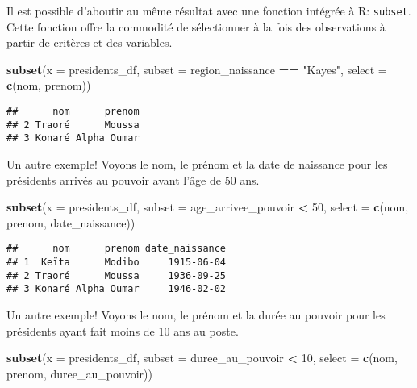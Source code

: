 \documentclass[]{book}
\newenvironment{Shaded}{\begin{snugshade}}{\end{snugshade}}
\newcommand{\KeywordTok}[1]{\textcolor[rgb]{0.13,0.29,0.53}{\textbf{#1}}}
\newcommand{\DataTypeTok}[1]{\textcolor[rgb]{0.13,0.29,0.53}{#1}}
\newcommand{\DecValTok}[1]{\textcolor[rgb]{0.00,0.00,0.81}{#1}}
\newcommand{\StringTok}[1]{\textcolor[rgb]{0.31,0.60,0.02}{#1}}
\newcommand{\OperatorTok}[1]{\textcolor[rgb]{0.81,0.36,0.00}{\textbf{#1}}}
\newcommand{\NormalTok}[1]{#1}
\begin{document}
Il est possible d'aboutir au même résultat avec une fonction intégrée à
R: \texttt{subset}. Cette fonction offre la commodité de sélectionner à
la fois des observations à partir de critères et des variables.

\begin{Shaded}
\begin{Highlighting}[]
\KeywordTok{subset}\NormalTok{(}\DataTypeTok{x =}\NormalTok{ presidents_df, }\DataTypeTok{subset =}\NormalTok{ region_naissance }\OperatorTok{==}\StringTok{ "Kayes"}\NormalTok{, }\DataTypeTok{select =} \KeywordTok{c}\NormalTok{(nom, prenom))}
\end{Highlighting}
\end{Shaded}

\begin{verbatim}
##      nom      prenom
## 2 Traoré      Moussa
## 3 Konaré Alpha Oumar
\end{verbatim}

Un autre exemple! Voyons le nom, le prénom et la date de naissance pour
les présidents arrivés au pouvoir avant l'âge de 50 ans.

\begin{Shaded}
\begin{Highlighting}[]
\KeywordTok{subset}\NormalTok{(}\DataTypeTok{x =}\NormalTok{ presidents_df, }\DataTypeTok{subset =}\NormalTok{ age_arrivee_pouvoir }\OperatorTok{<}\StringTok{ }\DecValTok{50}\NormalTok{, }\DataTypeTok{select =} \KeywordTok{c}\NormalTok{(nom, prenom, date_naissance))}
\end{Highlighting}
\end{Shaded}

\begin{verbatim}
##      nom      prenom date_naissance
## 1  Keïta      Modibo     1915-06-04
## 2 Traoré      Moussa     1936-09-25
## 3 Konaré Alpha Oumar     1946-02-02
\end{verbatim}

Un autre exemple! Voyons le nom, le prénom et la durée au pouvoir pour
les présidents ayant fait moins de 10 ans au poste.

\begin{Shaded}
\begin{Highlighting}[]
\KeywordTok{subset}\NormalTok{(}\DataTypeTok{x =}\NormalTok{ presidents_df, }\DataTypeTok{subset =}\NormalTok{ duree_au_pouvoir }\OperatorTok{<}\StringTok{ }\DecValTok{10}\NormalTok{, }\DataTypeTok{select =} \KeywordTok{c}\NormalTok{(nom, prenom, duree_au_pouvoir))}
\end{Highlighting}
\end{Shaded}
\end{document}
